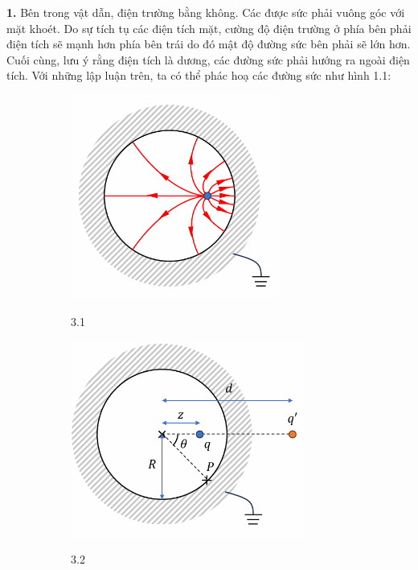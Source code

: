 \noindent\textbf{1.} Bên trong vật dẫn, điện trường bằng không. Các được sức phải vuông góc với mặt khoét. Do sự tích tụ các điện tích mặt, cường độ điện trường ở phía bên phải điện tích sẽ mạnh hơn phía bên trái do đó mật độ đường sức bên phải sẽ lớn hơn. Cuối cùng, lưu ý rằng điện tích là dương, các đường sức phải hướng ra ngoài điện tích. Với những lập luận trên, ta có thể phác hoạ các đường sức như hình 1.1:
\begin{figure}[h]
  \centering
  \begin{subfigure}[b]{0.49\textwidth}
    \centering
    \includegraphics[width=0.75\textwidth]{Figures/Solutions/Fig 3.1.png}
    \begin{center}
      \figurename{ 3.1}
    \end{center}
  \end{subfigure}
  \hfill
  \begin{subfigure}[b]{0.49\textwidth}
    \centering
    \includegraphics[width=0.85\textwidth]{Figures/Solutions/Fig 3.2.png}
    \begin{center}
      \figurename{ 3.2}
    \end{center}
  \end{subfigure}
\end{figure}

